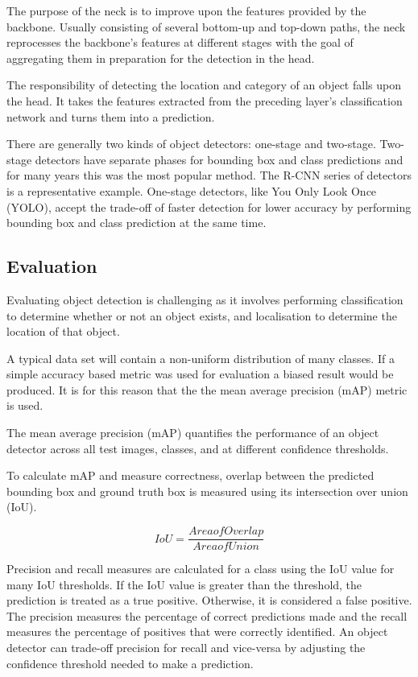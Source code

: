 \documentclass{thesis}
\begin{document}
The purpose of the neck is to improve upon the features provided by the backbone. Usually consisting of several bottom-up and top-down paths, the neck reprocesses the backbone's features at different stages with the goal of aggregating them in preparation for the detection in the head.

The responsibility of detecting the location and category of an object falls upon the head. It takes the features extracted from the preceding layer's classification network and turns them into a prediction. 

There are generally two kinds of object detectors: one-stage and two-stage. Two-stage detectors have separate phases for bounding box and class predictions and for many years this was the most popular method. The R-CNN series of detectors\cite{frcnn} is a representative example. One-stage detectors, like You Only Look Once (YOLO), accept the trade-off of faster detection for lower accuracy by performing bounding box and class prediction at the same time.

\subsection{Evaluation}

Evaluating object detection is challenging as it involves performing classification to determine whether or not an object exists, and localisation to determine the location of that object. 

A typical data set will contain a non-uniform distribution of many classes. If a simple accuracy based metric was used for evaluation a biased result would be produced. It is for this reason that the the mean average precision (mAP) metric is used.

The mean average precision (mAP) quantifies the performance of an object detector across all test images, classes, and at different confidence thresholds.

To calculate mAP and measure correctness, overlap between the predicted bounding box and ground truth box is measured using its intersection over union (IoU). 

\begin{equation}
    IoU = \frac{Area of Overlap}{Area of Union}
\end{equation}

Precision and recall measures are calculated for a class using the IoU value for many IoU thresholds. If the IoU value is greater than the threshold, the prediction is treated as a true positive. Otherwise, it is considered a false positive. The precision measures the percentage of correct predictions made and the recall measures the percentage of positives that were correctly identified. An object detector can trade-off precision for recall and vice-versa by adjusting the confidence threshold needed to make a prediction.
\end{document}
